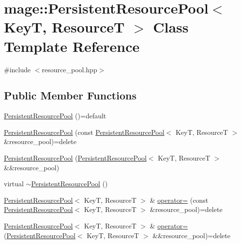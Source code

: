 \hypertarget{classmage_1_1_persistent_resource_pool}{}\section{mage\+:\+:Persistent\+Resource\+Pool$<$ KeyT, ResourceT $>$ Class Template Reference}
\label{classmage_1_1_persistent_resource_pool}


{\ttfamily \#include $<$resource\+\_\+pool.\+hpp$>$}

\subsection*{Public Member Functions}
\begin{DoxyCompactItemize}
\item 
\hyperlink{classmage_1_1_persistent_resource_pool_a23b83adf594628b93c368a2da7660ef8}{Persistent\+Resource\+Pool} ()=default
\item 
\hyperlink{classmage_1_1_persistent_resource_pool_aca217be62dbc93e4c6241defbfc454ff}{Persistent\+Resource\+Pool} (const \hyperlink{classmage_1_1_persistent_resource_pool}{Persistent\+Resource\+Pool}$<$ KeyT, ResourceT $>$ \&resource\+\_\+pool)=delete
\item 
\hyperlink{classmage_1_1_persistent_resource_pool_a65d48a56df4fc2ea4f38ffbc7a23a59d}{Persistent\+Resource\+Pool} (\hyperlink{classmage_1_1_persistent_resource_pool}{Persistent\+Resource\+Pool}$<$ KeyT, ResourceT $>$ \&\&resource\+\_\+pool)
\item 
virtual \hyperlink{classmage_1_1_persistent_resource_pool_a3408c2feb02a1d3b13c16d889fc50709}{$\sim$\+Persistent\+Resource\+Pool} ()
\item 
\hyperlink{classmage_1_1_persistent_resource_pool}{Persistent\+Resource\+Pool}$<$ KeyT, ResourceT $>$ \& \hyperlink{classmage_1_1_persistent_resource_pool_a14b9be5f6ac88941b12a3d63a9e6e127}{operator=} (const \hyperlink{classmage_1_1_persistent_resource_pool}{Persistent\+Resource\+Pool}$<$ KeyT, ResourceT $>$ \&resource\+\_\+pool)=delete
\item 
\hyperlink{classmage_1_1_persistent_resource_pool}{Persistent\+Resource\+Pool}$<$ KeyT, ResourceT $>$ \& \hyperlink{classmage_1_1_persistent_resource_pool_a7c83ee99233b8fc91d005c6edf6d729e}{operator=} (\hyperlink{classmage_1_1_persistent_resource_pool}{Persistent\+Resource\+Pool}$<$ KeyT, ResourceT $>$ \&\&resource\+\_\+pool)=delete
\item 

\end{DoxyCompactItemize}
